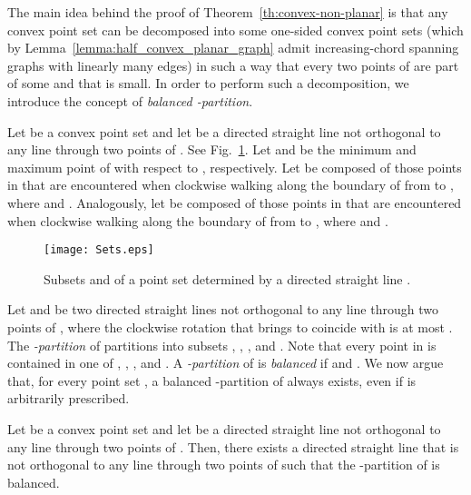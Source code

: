 \documentclass{llncs}
\begin{document}
The main idea behind the proof of Theorem~\ref{th:convex-non-planar} is that any convex point set  can be decomposed into some one-sided convex point sets  (which by Lemma~\ref{lemma:half_convex_planar_graph} admit increasing-chord spanning graphs with linearly many edges) in such a way that every two points of  are part of some  and that  is small. In order to perform such a decomposition, we introduce the concept of {\em balanced -partition}.

Let  be a convex point set and let  be a directed straight line not orthogonal to any line through two points of . See Fig.~\ref{fig:sets}. Let  and  be the minimum and maximum point of  with respect to , respectively. Let  be composed of those points in  that are encountered when clockwise walking along the boundary of  from  to , where  and . Analogously, let  be composed of those points in  that are encountered when clockwise walking along the boundary of  from  to , where  and .

\begin{figure}[tb]
\begin{center}
\mbox{\texttt{[image: Sets.eps]}}
\caption{Subsets  and  of a point set  determined by a directed straight line .}
\label{fig:sets}
\end{center}
\end{figure}

Let  and  be two directed straight lines not orthogonal to any line through two points of , where the clockwise rotation that brings  to coincide with  is at most . The {\em -partition} of  partitions  into subsets , , , and
. Note that every point in  is contained in one of , , , and . A {\em -partition} of  is {\em balanced} if  and . We now argue that, for every point set , a balanced -partition of  always exists, even if  is arbitrarily prescribed.

\begin{lemma} \label{le:partition}
Let  be a convex point set and let  be a directed straight line not orthogonal to any line through two points of . Then, there exists a directed straight line  that is not orthogonal to any line through two points of  such that the -partition of  is balanced.
\end{lemma}
\end{document}
